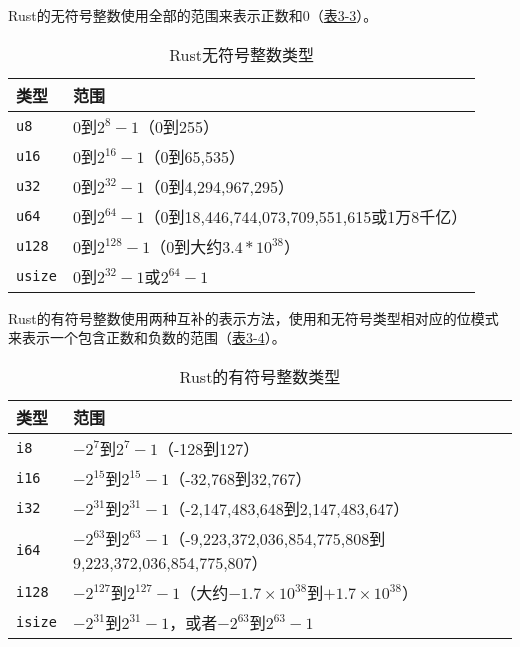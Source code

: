 Rust的无符号整数使用全部的范围来表示正数和0（\hyperref[t3-3]{表3-3}）。
\begin{table}[htbp]
    \centering
    \caption{Rust无符号整数类型}
    \label{t3-3}
    \begin{tabular}{ll}
        \hline
        \textbf{类型}   &   \textbf{范围}                   \\
        \hline
        \texttt{u8}     & 0到$2^{8}-1$（0到255）            \\
        \rowcolor{tablecolor}
        \texttt{u16}    & 0到$2^{16}-1$（0到65,535）        \\
        \texttt{u32}    & 0到$2^{32}-1$（0到4,294,967,295） \\
        \rowcolor{tablecolor}
        \texttt{u64}    & 0到$2^{64}-1$（0到18,446,744,073,709,551,615或1万8千亿）  \\
        \texttt{u128}   & 0到$2^{128}-1$（0到大约$3.4*10^{38}$）                    \\
        \rowcolor{tablecolor}
        \texttt{usize}  & 0到$2^{32}-1$或$2^{64}-1$         \\
    \end{tabular}
\end{table}

Rust的有符号整数使用两种互补的表示方法，使用和无符号类型相对应的位模式来表示一个包含正数和负数的范围（\hyperref[t3-4]{表3-4}）。
\begin{table}[htbp]
    \centering
    \caption{Rust的有符号整数类型}
    \label{t3-4}
    \begin{tabular}{ll}
        \hline
        \textbf{类型}   &   \textbf{范围}   \\
        \hline
        \texttt{i8}     & $-2^{7}$到$2^{7}-1$（-128到127）   \\
        \rowcolor{tablecolor}
        \texttt{i16}    & $-2^{15}$到$2^{15}-1$（-32,768到32,767）  \\
        \texttt{i32}    & $-2^{31}$到$2^{31}-1$（-2,147,483,648到2,147,483,647）    \\
        \rowcolor{tablecolor}
        \texttt{i64}    & $-2^{63}$到$2^{63}-1$（-9,223,372,036,854,775,808到9,223,372,036,854,775,807）    \\
        \texttt{i128}   & $-2^{127}$到$2^{127}-1$（大约$-1.7\times10^{38}$到$+1.7\times10^{38}$） \\
        \rowcolor{tablecolor}
        \texttt{isize}  & $-2^{31}$到$2^{31}-1$，或者$-2^{63}$到$2^{63}-1$  \\
    \end{tabular}
\end{table}

